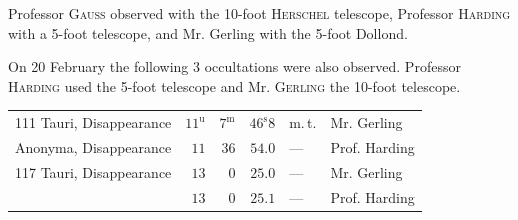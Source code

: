\par\indent Professor \textsc{Gauss} observed with the 10-foot \textsc{Herschel} telescope, Professor \textsc{Harding} with a 5-foot telescope, and Mr. Gerling with the 5-foot Dollond.

\par\indent On 20 February the following 3 occultations were also observed. Professor \textsc{Harding} used the 5-foot telescope and Mr. \textsc{Gerling} the 10-foot telescope.

\begin{center}\fontsize{9}{11}\selectfont\setlength{\tabcolsep}{2.5pt}\renewcommand{\arraystretch}{1.15}\begin{tabular}{lrrrll}
111 Tauri, Disappearance & $11^{\mathrm u}$ & $7^{\mathrm m}$ & $46^{\mathrm s}8$ & m.\,t. & Mr. Gerling\\
Anonyma, Disappearance & $11$ & $36$ & $54.0$ & — & Prof. Harding\\
117 Tauri, Disappearance & $13$ & $0$ & $25.0$ & — & Mr. Gerling\\
 & $13$ & $0$ & $25.1$ & — & Prof. Harding\\
\end{tabular}\end{center}
